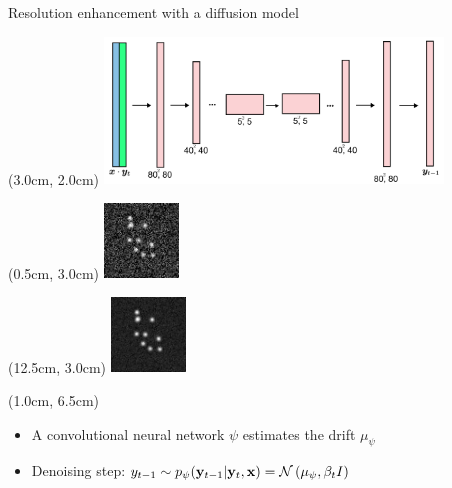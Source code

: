\documentclass{beamer}					%
\begin{document}
\begin{frame}{Resolution enhancement with a diffusion model}
\begin{textblock*}{9cm}(3.0cm, 2.0cm)
\includegraphics[width=9cm]{../../phd/ddpm/ddpm/media/DiffusionArch.png}
\end{textblock*}
\begin{textblock*}{2cm}(0.5cm, 3.0cm)
\includegraphics[width=2cm]{../../phd/dissertation/dissertation/media/diffusion_example/0_1_sr_79.png}
\end{textblock*}
\begin{textblock*}{2cm}(12.5cm, 3.0cm)
\includegraphics[width=2cm]{../../phd/dissertation/dissertation/media/diffusion_example/0_1_sr_99.png}
\end{textblock*}

\begin{textblock*}{13cm}(1.0cm, 6.5cm)
\begin{itemize}
\item A convolutional neural network $\psi$ estimates the drift $\mu_{\psi}$
\item Denoising step: $y_{t-1}\sim p_{\psi}(\bold{y}_{t-1}|\bold{y}_{t},\bold{x}) = \mathcal{N}\left(\mu_{\psi},\beta_{t}I\right)$
\end{itemize}
\end{textblock*}
\end{frame}
\end{document}
